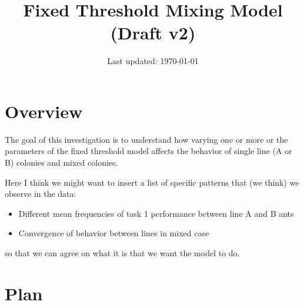 \documentclass[11pt]{article}
\title{Fixed Threshold Mixing Model ({\color{red}Draft v2})}
\author{\hspace{0pt}\vspace{-30pt}}
\date{Last updated: \today}
\begin{document}
\maketitle

\tableofcontents

\section{Overview}
The goal of this investigation is to understand how varying one or more or the parameters of the fixed threshold model affects the behavior of single line (A or B) colonies and mixed colonies.
\\

{\color{red}
Here I think we might want to insert a list of specific patterns that (we think) we observe in the data:
\begin{itemize}
    \item Different mean frequencies of task 1 performance between line A and B ants
    \item Convergence of behavior between lines in mixed case
\end{itemize}
so that we can agree on what it is that we want the model to do.
}

\section{Plan}
\end{document}
